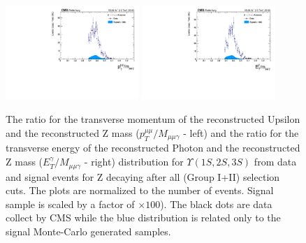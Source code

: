 \begin{figure}[!htbp]
\begin{center}
\includegraphics[width=0.45\textwidth]{figures_and_tables/outputPlots/ZtoUpsilon_Cat0_ZZZZZ/nEvts/data_x_mc/withKinCuts/h_withKin_upsilonPt_over_zMass}\hspace*{1.cm}
\includegraphics[width=0.45\textwidth]{figures_and_tables/outputPlots/ZtoUpsilon_Cat0_ZZZZZ/nEvts/data_x_mc/withKinCuts/h_withKin_photonPt_over_zMass}
\end{center}\vspace*{-.5cm}
\caption{The ratio for the transverse momentum of the reconstructed Upsilon and the reconstructed Z mass ($p_{T}^{\mu\mu}/M_{\mu\mu\gamma}$ - left) and the ratio for the transverse energy of the reconstructed Photon and the reconstructed Z mass ($E_{T}^{\gamma}/M_{\mu\mu\gamma}$ - right) distribution for $\Upsilon(1S,2S,3S)$ from data and signal events for Z decaying after all (Group I+II) selection cuts. The plots are normalized to the number of events. Signal sample is scaled by a factor of $\times 100$). The black dots are data collect by CMS while the blue distribution is related only to the signal Monte-Carlo generated samples.}
\label{fig:energy_ration_ZtoUpsilon_Cat0_groupI_plus_II}
\end{figure}


